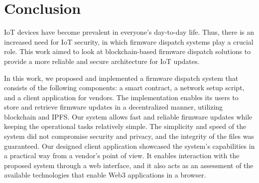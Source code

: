 \documentclass[conference]{IEEEtran}
\begin{document}
\section{Conclusion} \label{sec:6}
IoT devices have become prevalent in everyone's day-to-day life. Thus, there is an increased need for IoT security, in which firmware dispatch systems play a crucial role. This work aimed to look at blockchain-based firmware dispatch solutions to provide a more reliable and secure architecture for IoT updates.

In this work, we proposed and implemented a firmware dispatch system that consists of the following components: a smart contract, a network setup script, and a client application for vendors. The implementation enables its users to store and retrieve firmware updates in a decentralized manner, utilizing blockchain and IPFS. Our system allows fast and reliable firmware updates while keeping the operational tasks relatively simple. The simplicity and speed of the system did not compromise security and privacy, and the integrity of the files was guaranteed. Our designed client application showcased the system's capabilities in a practical way from a vendor's point of view. It enables interaction with the proposed system through a web interface, and it also acts as an assessment of the available technologies that enable Web3 applications in a browser.









%
%
\end{document}

